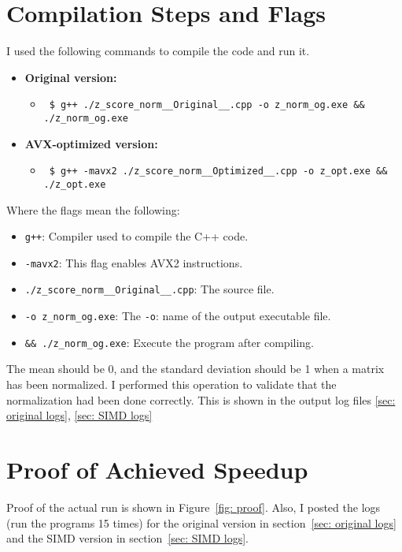 \documentclass{article}
\begin{document}
\section{Compilation Steps and Flags} \label{sec:compilation}
I used the following commands to compile the code and run it.
\begin{itemize}
    \item \textbf{Original version:}
          \begin{itemize}
              \item \begin{verbatim} $ g++ ./z_score_norm__Original__.cpp -o z_norm_og.exe && ./z_norm_og.exe \end{verbatim}
          \end{itemize}
    \item \textbf{AVX-optimized version:}
          \begin{itemize}
              \item \begin{verbatim} $ g++ -mavx2 ./z_score_norm__Optimized__.cpp -o z_opt.exe && ./z_opt.exe \end{verbatim}
          \end{itemize}

\end{itemize}
Where the flags mean the following:
\begin{itemize}
    \item \texttt{g++}: Compiler used to compile the C++ code.
    \item \texttt{-mavx2}: This flag enables AVX2 instructions.
    \item \texttt{./z\_score\_norm\_\_Original\_\_.cpp}: The source file.
    \item \texttt{-o z\_norm\_og.exe}: The \texttt{-o}: name of the output executable file.
    \item \texttt{\&\& ./z\_norm\_og.exe}: Execute the program after compiling.
\end{itemize}

The mean should be 0, and the standard deviation should be 1 when a matrix has been normalized.
I performed this operation to validate that the normalization had been done correctly.
This is shown in the output log files \ref{sec: original logs}, \ref{sec: SIMD logs}

\section{Proof of Achieved Speedup} \label{sec:speedup}
Proof of the actual run is shown in Figure~\ref{fig: proof}. Also, I posted the logs (run the programs 15 times) for the original version in section~\ref{sec: original logs} and the SIMD version in section~\ref{sec: SIMD logs}.
\end{document}
